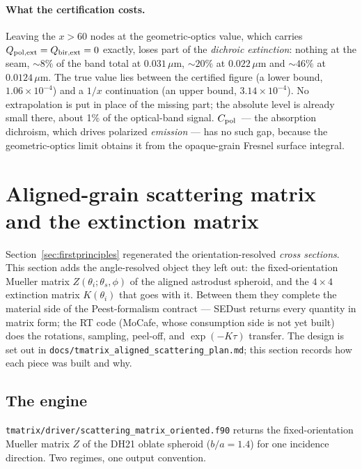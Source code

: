 \documentclass{my_memo}
\newcommand{\code}[1]{\texttt{#1}}
\newcommand{\um}{\ensuremath{\,\mu\mathrm{m}}}
\newcommand{\Cpol}{\ensuremath{C_{\rm pol}}}
\begin{document}
\paragraph{What the certification costs.} Leaving the $x > 60$ nodes at the
geometric-optics value, which carries $Q_{\rm pol,ext} = Q_{\rm bir,ext} = 0$
exactly, loses part of the \emph{dichroic extinction}: nothing at the seam,
${\sim}8\%$ of the band total at $0.031\um$, ${\sim}20\%$ at $0.022\um$ and
${\sim}46\%$ at $0.0124\um$. The true value lies between the certified figure
(a lower bound, $1.06\times10^{-4}$) and a $1/x$ continuation (an upper bound,
$3.14\times10^{-4}$). No extrapolation is put in place of the missing part; the
absolute level is already small there, about 1\% of the optical-band signal.
\Cpol\ --- the absorption dichroism, which drives polarized \emph{emission} ---
has no such gap, because the geometric-optics limit obtains it from the
opaque-grain Fresnel surface integral.

\section{Aligned-grain scattering matrix and the extinction matrix}
\label{sec:aligned}

Section~\ref{sec:firstprinciples} regenerated the orientation-resolved
\emph{cross sections}. This section adds the angle-resolved object they left out:
the fixed-orientation Mueller matrix $Z(\theta_i;\theta_s,\phi)$ of the aligned
astrodust spheroid, and the $4\times4$ extinction matrix $K(\theta_i)$ that goes
with it. Between them they complete the material side of the Peest-formalism
contract --- SEDust returns every quantity in matrix form; the RT code (MoCafe,
whose consumption side is not yet built) does the rotations, sampling, peel-off,
and $\exp(-K\tau)$ transfer. The design is set out in
\code{docs/tmatrix\_aligned\_scattering\_plan.md}; this section records how each
piece was built and why.

\subsection{The engine}\label{sec:aligned:engine}

\code{tmatrix/driver/scattering\_matrix\_oriented.f90} returns the
fixed-orientation Mueller matrix $Z$ of the DH21 oblate spheroid ($b/a=1.4$) for
one incidence direction. Two regimes, one output convention.
\end{document}
